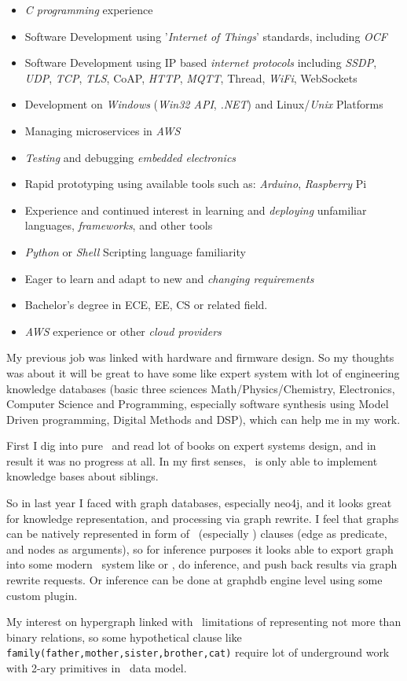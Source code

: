 \begin{framed}\noindent
\begin{itemize}[nosep,leftmargin=*]
\item \emph{C programming} experience
\item Software Development using '\emph{Internet of Things}' standards, including \emph{OCF}
\item Software Development using IP based \emph{internet protocols} including \emph{SSDP}, \emph{UDP}, \emph{TCP}, \emph{TLS}, CoAP, \emph{HTTP}, \emph{MQTT}, Thread, \emph{WiFi}, WebSockets
\item Development on \emph{Windows} (\emph{Win32 API}, \emph{.NET}) and Linux/\emph{Unix} Platforms
\item Managing microservices in \emph{AWS}
\item \emph{Testing} and debugging \emph{embedded electronics}
\item Rapid prototyping using available tools such as: \emph{Arduino}, \emph{Raspberry} Pi
\item Experience and continued interest in learning and \emph{deploying} unfamiliar languages, \emph{frameworks}, and other tools
\item \emph{Python} or \emph{Shell} Scripting language familiarity
\item Eager to learn and adapt to new and \emph{changing requirements}
\item Bachelor's degree in ECE, EE, CS or related field.
\item \emph{AWS} experience or other \emph{cloud providers}
\end{itemize}
\end{framed}

My previous job was linked with hardware and firmware design. So my thoughts was
about it will be great to have some  like expert system with
lot of engineering knowledge databases (basic three sciences
Math/Physics/Chemistry, Electronics, Computer Science and Programming,
especially software synthesis using Model Driven programming, Digital Methods
and DSP), which can help me in my work.

First I dig into pure \prolog\ and read lot of books on expert systems design,
and in result it was no progress at all. In my first senses, \prolog\ is only
able to implement knowledge bases about siblings.

So in last year I faced with graph databases, especially neo4j, and it looks
great for knowledge representation, and processing via graph rewrite. I feel
that graphs can be natively represented in form of \prolog\ (especially
) clauses (edge as
predicate, and nodes as arguments), so for inference purposes it looks able to
export graph into some modern \prolog\ system like
 or \xsb, do inference,
and push back results via graph rewrite requests. Or inference can be done at
graphdb engine level using some custom plugin.

My interest on hypergraph linked with \neo\ limitations of representing not
more than binary relations, so some hypothetical clause like
\verb|family(father,mother,sister,brother,cat)| require lot of underground work
with 2-ary primitives in \neo\ data model.
